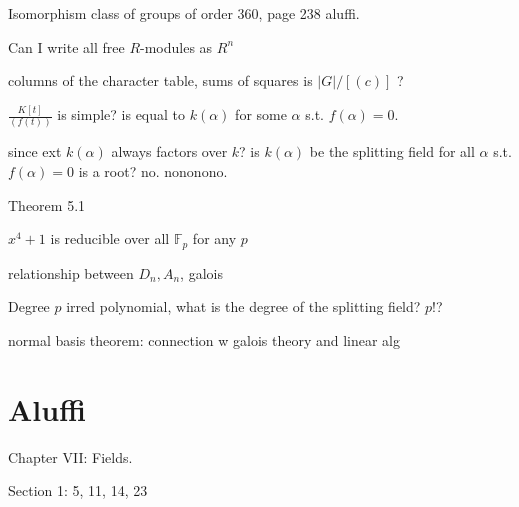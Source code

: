 \documentclass[openany]{book}
\newcommand{\F}{\mathbb{F}}
\begin{document}


\begin{prob}
    Isomorphism class of groups of order 360, page 238 aluffi.
\end{prob}


\begin{prob}
    Can I write all free $R$-modules as $R^n$
\end{prob}


\begin{prob}
    columns of the character table, sums of squares is $|G|/[(c)]$ ?
\end{prob}


\begin{prob}
    $\frac{K[t]}{(f(t))}$ is simple? is equal to $k(\alpha)$ for some $\alpha$ s.t. $f(\alpha)=0$.
\end{prob}



\begin{prob}
    since ext $k(\alpha)$ always factors over $k$? is $k(\alpha)$ be the splitting field for all $\alpha$ s.t. $f(\alpha)=0$ is a root? no. nononono.
\end{prob}

\begin{prob}
    Theorem 5.1
\end{prob}
\begin{prob}
    $x^4+1$ is reducible over all $\F_p$ for any $p$
\end{prob}

\begin{prob}
    relationship between $D_n, A_n$, galois
\end{prob}


\begin{prob}
    Degree $p$ irred polynomial, what is the degree of the splitting field? $p!$?
\end{prob}

\newpage
\begin{prob}
    normal basis theorem: connection w galois theory and linear alg
\end{prob}



\chapter{Aluffi}

Chapter VII: Fields.


Section 1: 5, 11, 14, 23
\end{document}
